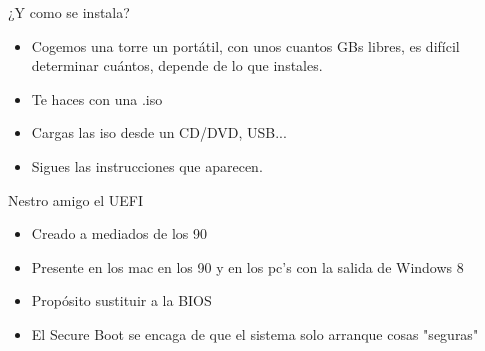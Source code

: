 \documentclass{beamer}
\begin{document}
\begin{frame}{¿Y como se instala?}{}
\begin{itemize}
\item Cogemos una torre un portátil, con unos cuantos GBs libres, es difícil determinar cuántos, depende de lo que instales.
\item Te haces con una .iso
\item Cargas las iso desde un CD/DVD, USB...
\item Sigues las instrucciones que aparecen.
\end{itemize}
\end{frame}

\begin{frame}{Nestro amigo el UEFI}
\begin{itemize}
\item Creado a mediados de los 90
\item Presente en los mac en los 90 y en los pc's con la salida de Windows 8
\item Propósito sustituir a la BIOS
\item El Secure Boot se encaga de que el sistema solo arranque cosas "seguras" 
\end{itemize}
\end{frame}
\end{document}
